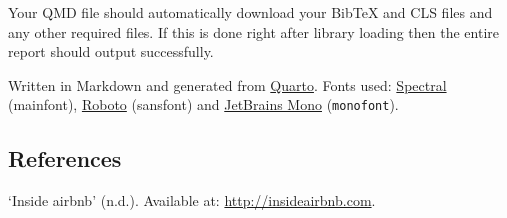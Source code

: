 \documentclass[
  a4paper,
  DIV=11,
  numbers=noendperiod]{scrartcl}
\newlength{\cslhangindent}
\newenvironment{CSLReferences}[2] %
 {\begin{list}{}{%
  \setlength{\itemindent}{0pt}
  \setlength{\leftmargin}{0pt}
  \setlength{\parsep}{0pt}
  \ifodd #1
   \setlength{\leftmargin}{\cslhangindent}
   \setlength{\itemindent}{-1\cslhangindent}
  \fi
  \setlength{\itemsep}{#2\baselineskip}}}
 {\end{list}}
\begin{document}
Your QMD file should automatically download your BibTeX and CLS files
and any other required files. If this is done right after library
loading then the entire report should output successfully.

Written in Markdown and generated from
\href{https://quarto.org/}{Quarto}. Fonts used:
\href{https://fonts.google.com/specimen/Spectral}{Spectral} (mainfont),
\href{https://fonts.google.com/specimen/Roboto}{Roboto} ({sansfont}) and
\href{https://fonts.google.com/specimen/JetBrains\%20Mono}{JetBrains
Mono} (\texttt{monofont}).

\subsection*{References}\label{references}

\label{refs}
\begin{CSLReferences}{0}{1}
{`Inside airbnb'} (n.d.). Available at: \url{http://insideairbnb.com}.

\end{CSLReferences}
\end{document}
